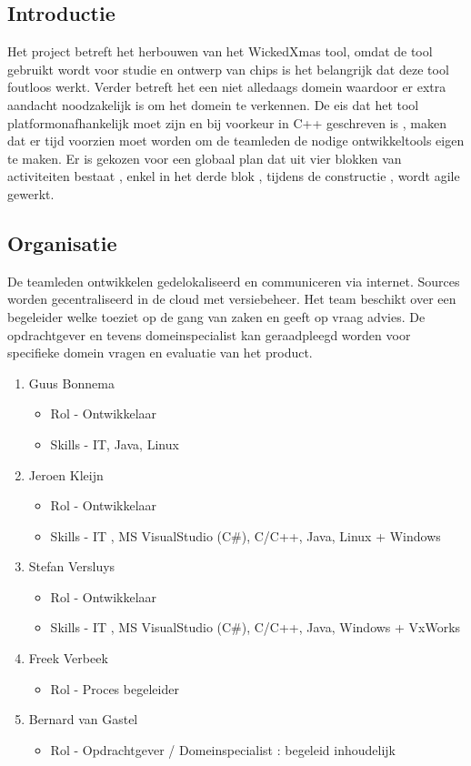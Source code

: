 
\subsection{Introductie}
Het project betreft het herbouwen van het WickedXmas tool, omdat de tool gebruikt wordt voor studie en ontwerp van chips is het belangrijk dat deze tool foutloos werkt. Verder betreft het een niet alledaags domein waardoor er extra aandacht noodzakelijk is om het domein te verkennen. De eis dat het tool platformonafhankelijk moet zijn en bij voorkeur in C++ geschreven is , maken dat er tijd voorzien moet worden om de teamleden de nodige ontwikkeltools eigen te maken. 
Er is gekozen voor een globaal plan dat uit vier blokken van activiteiten bestaat , enkel in het derde blok , tijdens de constructie , wordt agile gewerkt.

\subsection{Organisatie}
 De teamleden ontwikkelen gedelokaliseerd en communiceren via internet. Sources worden gecentraliseerd in de cloud met versiebeheer. Het team beschikt over een begeleider welke toeziet op de gang van zaken en geeft op vraag advies. De opdrachtgever en tevens domeinspecialist kan geraadpleegd worden voor specifieke domein vragen en evaluatie van het product.   
 \begin{enumerate}
 	\item Guus Bonnema
 	\begin{itemize}
		\item Rol - Ontwikkelaar
		\item Skills - IT, Java, Linux
	\end{itemize}
 	\item Jeroen Kleijn
 	\begin{itemize}
		\item Rol - Ontwikkelaar
		\item Skills - IT , MS VisualStudio (C\#), C/C++, Java, Linux + Windows
	\end{itemize}
 	\item Stefan Versluys
 	\begin{itemize}
		\item Rol - Ontwikkelaar
		\item Skills - IT , MS VisualStudio (C\#), C/C++, Java, Windows + VxWorks
	\end{itemize}
	\item Freek Verbeek
	\begin{itemize}
		\item Rol - Proces begeleider
	\end{itemize}
	\item Bernard van Gastel
	\begin{itemize}
		\item Rol - Opdrachtgever / Domeinspecialist : begeleid inhoudelijk
	\end{itemize}
	
 \end{enumerate}
 
